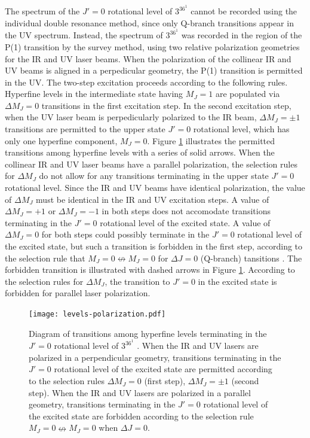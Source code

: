 \documentclass[12pt]{mitthesis}
\begin{document}
The spectrum of the $J'=0$ rotational level of $3^36^1$  cannot
be recorded using the individual double resonance method, since only
Q-branch transitions appear in the UV spectrum.  Instead, the spectrum
of $3^36^1$  was recorded in the region of the P(1) transition
by the survey method, using two relative polarization geometries for
the IR and UV laser beams.  When the polarization of the collinear IR
and UV beams is aligned in a perpedicular geometry, the P(1)
transition is permitted in the UV.  The two-step excitation proceeds
according to the following rules.  Hyperfine levels in the
intermediate state having $M_J=1$ are populated via $\Delta M_J=0$
transitions in the first excitation step.  In the second excitation
step, when the UV laser beam is perpedicularly polarized to the IR
beam, $\Delta M_J = \pm 1$ transitions are permitted to the upper
state $J'=0$ rotational level, which has only one hyperfine component,
$M_J=0$.  Figure \ref{fig:levels-polarization} illustrates the
permitted transitions among hyperfine levels with a series of solid
arrows.  When the collinear IR and UV laser beams have a parallel
polarization, the selection rules for $\Delta M_J$ do not allow for
any transitions terminating in the upper state $J'=0$ rotational
level.  Since the IR and UV beams have identical polarization, the
value of $\Delta M_J$ must be identical in the IR and UV excitation
steps.  A value of $\Delta M_J = + 1$ or $\Delta M_J = - 1$ in both
steps does not accomodate transitions terminating in the $J'=0$
rotational level of the excited state.  A value of $\Delta M_J = 0$
for both steps could possibly terminate in the $J'=0$ rotational level
of the excited state, but such a transition is forbidden in the first
step, according to the selection rule that $M_J=0 \nleftrightarrow
M_J=0$ for $\Delta J = 0$ (Q-branch) tansitions \cite{herzberg66}.
The forbidden transition is illustrated with dashed arrows in Figure
\ref{fig:levels-polarization}.  According to the selection rules for
$\Delta M_J$, the transition to $J'=0$ in the excited state is
forbidden for parallel laser polarization.


\begin{figure}
  \caption{Diagram of transitions among hyperfine levels terminating
    in the $J'=0$ rotational level of $3^36^1$ .  When the IR
    and UV lasers are polarized in a perpendicular geometry,
    transitions terminating in the $J'=0$ rotational level of the
    excited state are permitted according to the selection rules
    $\Delta M_J = 0$ (first step), $\Delta M_J = \pm 1$ (second step).
    When the IR and UV lasers are polarized in a parallel geometry,
    transitions terminating in the $J'=0$ rotational level of the
    excited state are forbidden according to the selection rule $M_J =
    0 \nleftrightarrow M_J = 0$ when $\Delta J = 0$.}
  \label{fig:levels-polarization}

  \centering
  \texttt{[image: levels-polarization.pdf]}
\end{figure}
\end{document}
